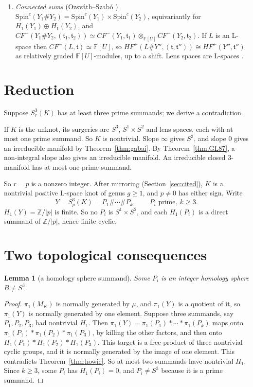 \documentclass[11pt]{article}
\newtheorem{lemma}[theorem]{Lemma}
\theoremstyle{definition}
\newcommand{\F}{\mathbb{F}}
\newcommand{\Z}{\mathbb{Z}}
\newcommand{\HFp}{\mathit{HF}^+}
\newcommand{\CFm}{\mathit{CF}^-}
\newcommand{\Spinc}{\mathrm{Spin}^c}
\begin{document}
\begin{enumerate}[label=(H\arabic*),leftmargin=*]
\item\label{H:sum} \emph{Connected sums} (Ozsv\'ath--Szab\'o \cite{OSapp}). $\Spinc(Y_1\#Y_2)=\Spinc(Y_1)\times\Spinc(Y_2)$, equivariantly for $H_1(Y_1)\oplus H_1(Y_2)$, and $\CFm(Y_1\#Y_2,(\mathfrak t_1,\mathfrak t_2))\simeq\CFm(Y_1,\mathfrak t_1)\otimes_{\F[U]}\CFm(Y_2,\mathfrak t_2)$. If $L$ is an L-space then $\CFm(L,\mathfrak t)\simeq\F[U]$, so $\HFp(L\#Y'',(\mathfrak t,\mathfrak t''))\cong\HFp(Y'',\mathfrak t'')$ as relatively graded $\F[U]$-modules, up to a shift. Lens spaces are L-spaces \cite{OSlens}.
\end{enumerate}

\section{Reduction}\label{sec:reduction}

Suppose $S^3_r(K)$ has at least three prime summands; we derive a contradiction.

If $K$ is the unknot, its surgeries are $S^3$, $S^1\times S^2$ and lens spaces, each with at most one prime summand. So $K$ is nontrivial. Slope $\infty$ gives $S^3$, and slope $0$ gives an irreducible manifold by Theorem~\ref{thm:gabai}. By Theorem~\ref{thm:GL87}, a non-integral slope also gives an irreducible manifold. An irreducible closed $3$-manifold has at most one prime summand.

So $r=p$ is a nonzero integer. After mirroring (Section~\ref{sec:cited}), $K$ is a nontrivial positive L-space knot of genus $g\ge1$, and $p\ne0$ has either sign. Write
\[
Y=S^3_p(K)=P_1\#\cdots\#P_k,\qquad P_i \text{ prime},\ k\ge3.
\]
$H_1(Y)=\Z/|p|$ is finite. So no $P_i$ is $S^1\times S^2$, and each $H_1(P_i)$ is a direct summand of $\Z/|p|$, hence finite cyclic.

\section{Two topological consequences}\label{sec:topo}

\begin{lemma}[a homology sphere summand]\label{lem:hs}
Some $P_i$ is an integer homology sphere $B\ne S^3$.
\end{lemma}

\begin{proof}
$\pi_1(M_K)$ is normally generated by $\mu$, and $\pi_1(Y)$ is a quotient of it, so $\pi_1(Y)$ is normally generated by one element. Suppose three summands, say $P_1,P_2,P_3$, had nontrivial $H_1$. Then $\pi_1(Y)=\pi_1(P_1)*\cdots*\pi_1(P_k)$ maps onto $\pi_1(P_1)*\pi_1(P_2)*\pi_1(P_3)$, by killing the other factors, and then onto $H_1(P_1)*H_1(P_2)*H_1(P_3)$. This target is a free product of three nontrivial cyclic groups, and it is normally generated by the image of one element. This contradicts Theorem~\ref{thm:howie}. So at most two summands have nontrivial $H_1$. Since $k\ge3$, some $P_i$ has $H_1(P_i)=0$, and $P_i\ne S^3$ because it is a prime summand.
\end{proof}
\end{document}
